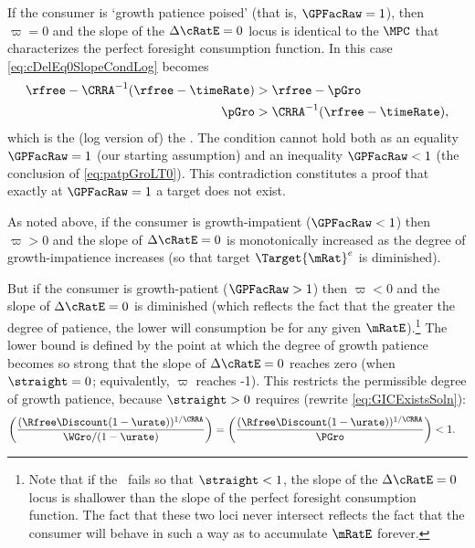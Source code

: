\documentclass{handout}
\begin{document}
If the consumer is `growth patience poised' (that is, $\GPFacRaw = 1$), then $\varpi = 0$ and the slope of the $\dcEqZero$ locus is identical to the $\MPCU$ that characterizes the perfect foresight consumption function.  In this case \eqref{eq:cDelEq0SlopeCondLog} becomes
\begin{equation}\begin{gathered}\begin{aligned}
  \rfree-\CRRA^{-1}(\rfree-\timeRate) & >   \rfree-\pGro
\\ \pGro & >  \CRRA^{-1}(\rfree-\timeRate) \label{eq:patpGroLT0}
,\end{aligned}\end{gathered}\end{equation}
which is the (log version of) the \GICPGro.  The condition cannot hold both as an equality $\GPFacRaw=1$ (our starting assumption) and an inequality $\GPFacRaw < 1$ (the conclusion of \eqref{eq:patpGroLT0}).  This contradiction constitutes a proof that exactly at $\GPFacRaw=1$ a target does not exist.


As noted above, if the consumer is growth-impatient ($\GPFacRaw < 1$) then $\varpi > 0$ and the slope of $\dcEqZero$ is monotonically increased as the degree of growth-impatience increases (so that target $\Target{\mRat}^{e}$ is diminished).  

But if the consumer is growth-patient ($\GPFacRaw > 1$) then $\varpi < 0$ and the slope of $\dcEqZero$ is diminished (which reflects the fact that the greater the degree of patience, the lower will consumption be for any given $\mRatE$).\footnote{Note that if the \GICPGro~fails so that $\straight < 1$, the slope of the $\dcEqZero$ locus is shallower than the slope of the perfect foresight consumption function.  The fact that these two loci never intersect reflects the fact that the consumer will behave in such a way as to accumulate $\mRatE$ forever.}  The lower bound is defined by the point at which the degree of growth patience becomes so strong that the slope of $\dcEqZero$ reaches zero (when $\straight=0$; equivalently, $\varpi$ reaches -1).  This restricts the permissible degree of growth patience, because $\straight > 0$ requires (rewrite \eqref{eq:GICExistsSoln}):
\begin{equation}\begin{gathered}\begin{aligned}
  \left(\frac{(\Rfree \Discount (1-\urate))^{1/\CRRA}}{\WGro/(1-\urate)}\right) = \left(\frac{(\Rfree \Discount (1-\urate))^{1/\CRRA}}{\PGro}\right) & <  1
.\end{aligned}\end{gathered}\end{equation}
\end{document}

